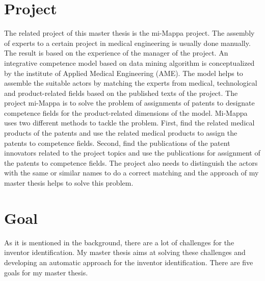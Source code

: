 \section{Project}
The related project of this master thesis is the mi-Mappa project. The assembly of experts to a certain project in medical engineering is usually done manually. The result is based on the experience of the manager of the project. An integrative competence model based on data mining algorithm is conceptualized by the institute  of Applied Medical Engineering (AME). The model helps to assemble the suitable actors by matching the experts from medical, technological and product-related fields based on the published texts of the project. The project mi-Mappa is to solve the problem of assignments of patents to designate competence fields for the product-related dimensions of the model. Mi-Mappa uses two different methods to tackle the problem. First, find the related medical products of the patents and use the related medical products to assign the patents to competence fields. Second, find the publications of the patent innovators related to the project topics and use the publications for assignment of the patents to competence fields. The project also needs to distinguish the actors with the same or similar names to do a correct matching and the approach of my master thesis helps to solve this problem.

\section{Goal}
As it is mentioned in the background, there are a lot of challenges for the inventor identification. My master thesis aims at solving these challenges and developing an automatic approach for the inventor identification. There are five goals for my master thesis. 

